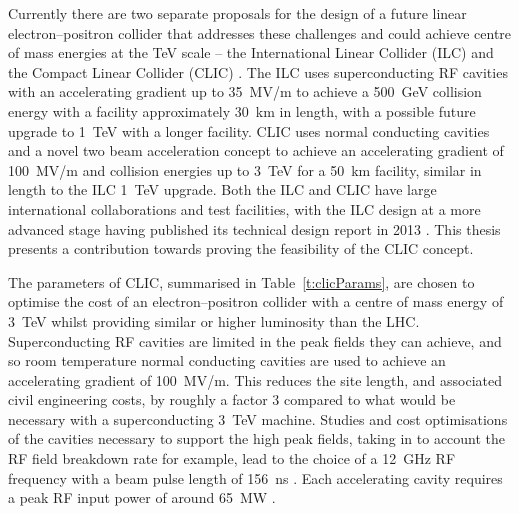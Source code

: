 Currently there are two separate proposals for the design of a future linear electron--positron collider that addresses these challenges and could achieve centre of mass energies at the TeV scale -- the International Linear Collider (ILC) \cite{ILC} and the Compact Linear Collider (CLIC) \cite{clicCDR}. The ILC uses superconducting RF cavities with an accelerating gradient up to 35~MV/m to achieve a 500~GeV collision energy with a facility approximately 30~km in length, with a possible future upgrade to 1~TeV with a longer facility.  CLIC uses normal conducting cavities and a novel two beam acceleration concept to achieve an accelerating gradient of 100~MV/m and collision energies up to 3~TeV for a 50~km facility, similar in length to the ILC 1~TeV upgrade. Both the ILC and CLIC have large international collaborations and test facilities, with the ILC design at a more advanced stage having published its technical design report in 2013 \cite{ILC}. This thesis presents a contribution towards proving the feasibility of the CLIC concept.


The parameters of CLIC, summarised in Table~\ref{t:clicParams}, are chosen to optimise the cost of an electron--positron collider with a centre of mass energy of 3~TeV whilst providing similar or higher luminosity than the LHC. Superconducting RF cavities are limited in the peak fields they can achieve, and so room temperature normal conducting cavities are used to achieve an accelerating gradient of 100~MV/m. This reduces the site length, and associated civil engineering costs, by roughly a factor 3 compared to what would be necessary with a superconducting 3~TeV machine. Studies and cost optimisations of the cavities necessary to support the high peak fields, taking in to account the RF field breakdown rate for example, lead to the choice of a 12~GHz RF frequency with a beam pulse length of 156~ns \cite{clicCDR}. Each accelerating cavity requires a peak RF input power of around 65~MW \cite{clicCDR}.


